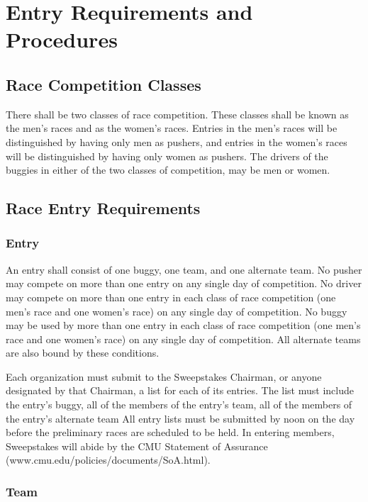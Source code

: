 \chapter{Entry Requirements and Procedures}

\section{Race Competition Classes}
	
	There shall be two classes of race competition. These classes shall be known as
	the men's races and as the women's races. Entries in the men's races will be
	distinguished by having only men as pushers, and entries in the women's races
	will be distinguished by having only women as pushers. The drivers of the
	buggies in either of the two classes of competition, may be men or women.

\section{Race Entry Requirements}

\subsection{Entry}

	An entry shall consist of one buggy, one team, and one alternate team. No
	pusher may compete on more than one entry on any single day of competition. No
	driver may compete on more than one entry in each class of race competition
	(one men's race and one women's race) on any single day of competition. No
	buggy may be used by more than one entry in each class of race competition (one
	men's race and one women's race) on any single day of competition. All
	alternate teams are also bound by these conditions.

	Each organization must submit to the Sweepstakes Chairman, or anyone designated
	by that Chairman, a list for each of its entries. The list must include the
	entry's buggy, all of the members of the entry's team, all of the members of
	the entry's alternate team All entry lists must be submitted by noon on the day
	before the preliminary races are scheduled to be held.  In entering members,
	Sweepstakes will abide by the CMU Statement of Assurance
	(www.cmu.edu/policies/documents/SoA.html).

\subsection{Team}


